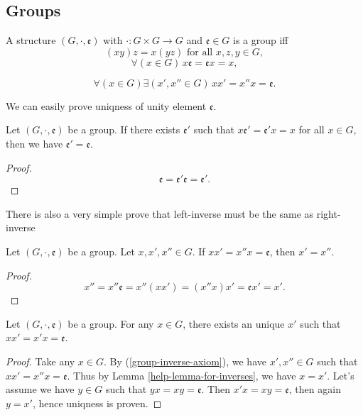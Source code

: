 \documentclass[main.tex]{subfiles}
\begin{document}
\subsection{Groups}

\begin{definition}
\label{group-definition}
A structure $(G, \cdot, \mathfrak{e})$ with $\cdot : G\times G\to G$ and $\mathfrak{e}\in G$ is a group iff
\begin{equation}
(xy)z = x(yz) \text{ for all } x,z,y\in G,
\end{equation}
\begin{equation}
\forall (x\in G) \, x\mathfrak{e} = \mathfrak{e} x = x, 
\end{equation}

\begin{equation}
\label{group-inverse-axiom}
\forall (x\in G)\exists(x', x'' \in G)\, xx' = x''x = \mathfrak{e}. 
\end{equation}
\end{definition}

We can easily prove uniqness of unity element $\mathfrak{e}$.

\begin{proposition}
Let $(G, \cdot, \mathfrak{e})$ be a group. If there exists $\mathfrak{e}'$ such that $x\mathfrak{e}' = \mathfrak{e}'x = x$ for all $x\in G$, then we have $\mathfrak{e}' = \mathfrak{e}$.
\end{proposition}

\begin{proof}
\begin{equation}
\mathfrak{e} = \mathfrak{e}'\mathfrak{e} = \mathfrak{e}'.
\end{equation}
\end{proof}

There is also a very simple prove that left-inverse must be the same as right-inverse
\begin{lemma}
\label{help-lemma-for-inverses}
Let $(G, \cdot, \mathfrak{e})$ be a group. Let $x, x', x''\in G$. If $xx'=x''x=\mathfrak{e}$, then $x' = x''$.
\end{lemma}
\begin{proof}
\begin{equation}
x'' = x''\mathfrak{e} = x''(xx') = (x''x)x' = \mathfrak{e} x' = x'.
\end{equation}
\end{proof}
\begin{proposition}
Let $(G, \cdot, \mathfrak{e})$ be a group. For any $x\in G$, there exists an unique $x'$ such that $xx'= x'x = \mathfrak{e}$.
\end{proposition}
\begin{proof}
Take any $x\in G$. By (\ref{group-inverse-axiom}), we have $x', x''\in G$ such that $xx'=x''x=\mathfrak{e}$. 
Thus by Lemma \ref{help-lemma-for-inverses}, we have $x = x'$. Let's assume we have $y\in G$ such that $yx = xy = \mathfrak{e}$. Then $x'x = xy = \mathfrak{e}$, then again $y = x'$, hence uniqness is proven.
\end{proof}
\end{document}
